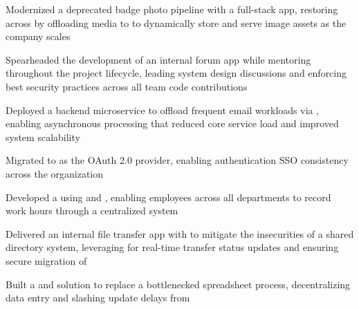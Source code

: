 
\begin{bullets}
		\item Modernized a deprecated badge photo pipeline with a full-stack  app, restoring  across  by offloading media to  to dynamically store and serve image assets as the company scales

		\item Spearheaded the development of an internal forum app while mentoring  throughout the project lifecycle, leading system design discussions and enforcing best security practices across all team code contributions

		\item Deployed a  backend microservice to offload frequent email workloads via , enabling asynchronous processing that reduced core service load and improved system scalability

		\item Migrated  to  as the OAuth 2.0 provider, enabling authentication SSO consistency across the organization

		\item Developed a  using  and , enabling employees across all departments to record work hours through a centralized system
\end{bullets}

\begin{bullets}
	\item Delivered an internal file transfer app with  to mitigate the insecurities of a shared directory system, leveraging  for real-time transfer status updates and ensuring secure migration of 

	\item Built a  and  solution to replace a bottlenecked spreadsheet process, decentralizing data entry and slashing update delays from 
\end{bullets}